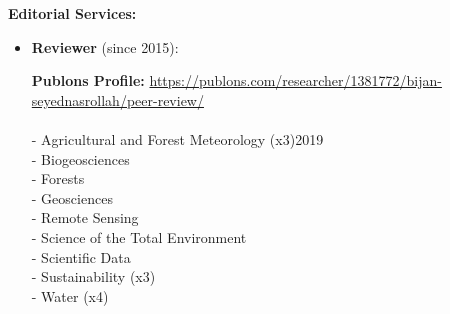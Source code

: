 \documentclass[10pt]{article}
\newenvironment{changemargin}[2]{%
  \begin{list}{}{%
 \setlength{\topsep}{0pt}%
 \setlength{\leftmargin}{#1}%
 \setlength{\rightmargin}{#2}%
 \setlength{\listparindent}{\parindent}%
 \setlength{\itemindent}{\parindent}%
 \setlength{\parsep}{\parskip}%
  }%
  \item[]}{\end{list}
}
\newenvironment{body} {
  \vspace*{-2pt}
  \begin{changemargin}{-0.5in}{-0.5in}
}
{\end{changemargin}
}
\begin{document}
\begin{body}
  \textbf{Editorial Services:} \\
  \vspace*{-4pt}
  \begin{itemize} \itemsep -0pt
    \item[] \textbf {Reviewer} (since 2015):
          \newline
          
          \hspace*{8pt} \textbf{Publons Profile: }\url{https://publons.com/researcher/1381772/bijan-seyednasrollah/peer-review/} \\

          \hspace*{8pt} \\
          \hspace*{8pt}  - Agricultural and Forest Meteorology (x3)\hfill {2019} \\
          \hspace*{8pt}  - Biogeosciences \\
          \hspace*{8pt}  - Forests \\
          \hspace*{8pt}  - Geosciences \\
          \hspace*{8pt}  - Remote Sensing \\
          \hspace*{8pt}  - Science of the Total Environment \\
          \hspace*{8pt}  - Scientific Data\\
          \hspace*{8pt}  - Sustainability (x3)\\
          \hspace*{8pt}  - Water (x4) \\
          \bigskip


\end{itemize}
\end{body}
\end{document}
